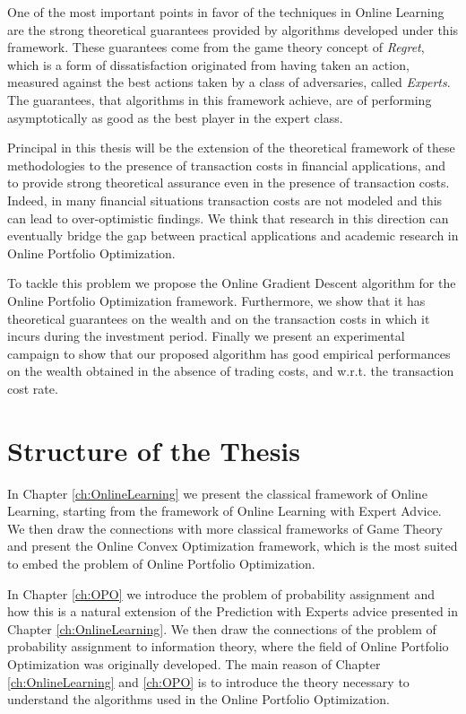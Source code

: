 One of the most important points in favor of the techniques in Online Learning are the strong theoretical guarantees provided by algorithms developed under this framework. These guarantees come from the game theory concept of \emph{Regret}, which is a form of dissatisfaction originated from having taken an action, measured against the best actions taken by a class of  adversaries, called \emph{Experts}. The guarantees, that algorithms in this framework achieve, are of performing asymptotically as good as the best player in the expert class.

Principal in this thesis will be the extension of the theoretical framework of these methodologies to the presence of transaction costs in financial applications, and to provide strong theoretical assurance even in the presence of transaction costs. Indeed, in many financial situations transaction costs are not modeled and this can lead to over-optimistic findings. We think that research in this direction can eventually bridge the gap between practical applications and academic research in Online Portfolio Optimization.

To tackle this problem we propose the Online Gradient Descent algorithm for the Online Portfolio Optimization framework. Furthermore, we show that it has theoretical guarantees on the wealth and on the transaction costs in which it incurs during the investment period. Finally we present an experimental campaign to show that our proposed algorithm has good empirical performances on the wealth obtained in the absence of trading costs, and w.r.t. the transaction cost rate.

\section{Structure of the Thesis}

In Chapter \ref{ch:OnlineLearning} we present the classical framework of Online Learning, starting from the framework of Online Learning with Expert Advice. We then draw the connections with more classical frameworks of Game Theory and present the Online Convex Optimization framework, which is the most suited to embed the problem of Online Portfolio Optimization. 

In Chapter \ref{ch:OPO} we introduce the problem of probability assignment and how this is a natural extension of the Prediction with Experts advice presented in Chapter \ref{ch:OnlineLearning}. We then draw the connections of the problem of probability assignment to information theory, where the field of Online Portfolio Optimization was originally developed. The main reason of Chapter \ref{ch:OnlineLearning} and \ref{ch:OPO} is to introduce the theory necessary to understand the algorithms used in the Online Portfolio Optimization.


